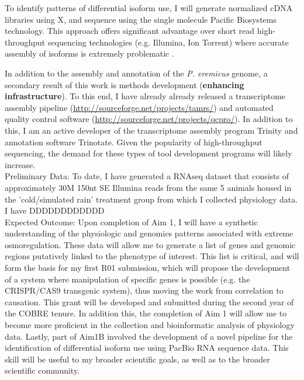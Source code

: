 \documentclass[11pt]{article}
\begin{document}
To identify patterns of differential isoform use, I will generate normalized cDNA libraries using X, and sequence using the single molecule Pacific Biosystems technology. This approach offers significant advantage over short read high-throughput sequencing technologies (e.g. Illumina, Ion Torrent) where accurate assembly of isoforms is extremely problematic \citep{Pyrkosz:2013tm}.


In addition to the assembly and annotation of the \textit{P. eremicus} genome, a secondary result of this work is methods development (\textbf{enhancing infrastructure}). To this end, I have already already released a transcriptome assembly pipeline (\url{http://sourceforge.net/projects/tamrs/}) and automated quality control software (\url{http://sourceforge.net/projects/qcpro/}). In addition to this, I am an active developer of the transcriptome assembly program Trinity and annotation software Trinotate. Given the popularity of high-throughput sequencing, the demand for these types of tool development programs will likely increase. \\

Preliminary Data: To date, I have generated a RNAseq dataset that consists of approximately 30M 150nt SE Illumina reads from the same 5 animals housed in the 'cold/simulated rain' treatment group from which I collected physiology data. I have DDDDDDDDDDDD \\

Expected Outcome: Upon completion of Aim 1, I will have a synthetic understanding of the physiologic and genomics patterns associated with extreme osmoregulation. These data will allow me to generate a list of genes and genomic regions putatively linked to the phenotype of interest. This list is critical, and will form the basis for my first R01 submission, which will propose the development of a system where manipulation of specific genes is possible (e.g. the CRISPR/CAS9 transgenic system), thus moving the work from correlation to causation. This grant will be developed and submitted during the second year of the COBRE tenure. In addition this, the completion of Aim 1 will allow me to become more proficient in the collection and bioinformatic analysis of physiology data. Lastly, part of Aim1B involved the development of a novel pipeline for the identification of differential isoform use using PacBio RNA sequence data. This skill will be useful to my broader scientific goals, as well as to the broader scientific community.    \\
\end{document}
